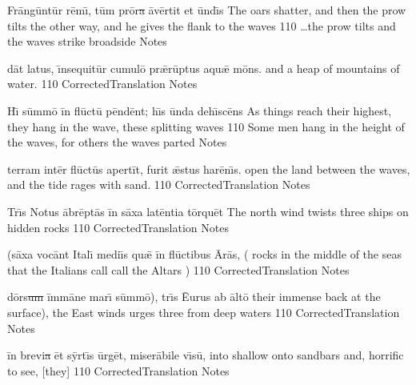 \newpage

\latline
  {Fr\=ang\=unt\=ur r\={\macron e}m\={\macron \i}, t\=um pr\={\macron o}r\sout{a }\={\macron a}v\=ert\-it \-et \=und\={\macron \i}s}
  { The oars shatter, and then the prow tilts the other way, and he gives the flank to the waves }
  {110}
  { \ldots the prow tilts and the waves strike broadside }
  { Notes }


\latline
  {d\=at l\-at\-us, \={\macron \i}ns\-equ\-it\=ur c\-um\-ul\={\macron o} pr\={\ae}r\=upt\-us \-aqu\={\ae} m\={\macron o}ns.}
  { and a heap of mountains of water.  }
  {110}
  { CorrectedTranslation }
  { Notes }


\latline
  {H\={\macron \i} s\=umm\={\macron o} \=in fl\={\macron u}ct\={\macron u} p\=end\=ent; h\={\macron \i}s \=und\-a d\-eh\={\macron \i}sc\={\macron e}ns}
  { As things reach their highest, they hang in the wave, these splitting waves }
  {110}
  { Some men hang in the height of the waves, for others the waves parted }
  { Notes }


\newpage

\latline
  {t\-err\-am \-int\=er fl\={\macron u}ct\={\macron u}s \-ap\-ert\=it, f\-ur\-it \={\ae}st\-us h\-ar\={\macron e}n\={\macron \i}s.}
  { open the land between the waves, and the tide rages with sand. }
  {110}
  { CorrectedTranslation }
  { Notes }


\latline
  {Tr\={\macron \i}s N\-ot\-us \=abr\=ept\={\macron a}s \=in s\=ax\-a l\-at\=ent\-i\-a t\=orqu\=et}
  { The north wind twists three ships on hidden rocks }
  {110}
  { CorrectedTranslation }
  { Notes }


\latline
  {(s\=ax\-a v\-oc\=ant \-It\-al\={\macron \i} m\-edi\={\macron \i}s qu\={\ae} \=in fl\={\macron u}ct\-ib\-us \={\macron A}r\={\macron a}s,}
  { ( rocks in the middle of the seas that the Italians call call the Altars )   }
  {110}
  { CorrectedTranslation }
  { Notes }


\newpage

\latline
  {d\=ors\sout{um }\=imm\={\macron a}n\-e m\-ar\={\macron \i} s\=umm\={\macron o}), tr\={\macron \i}s \={Eu}r\-us \-ab \=alt\={\macron o}}
  { their immense back at the surface), the East winds urges three from deep waters }
  {110}
  { CorrectedTranslation }
  { Notes }


\latline
  {\=in br\-ev\-i\sout{a }\=et s\=yrt\={\macron \i}s \=urg\=et, m\-is\-er\={\macron a}b\-il\-e v\={\macron \i}s\={\macron u},}
  { into shallow onto sandbars and, horrific to see, [they] }
  {110}
  { CorrectedTranslation }
  { Notes }


